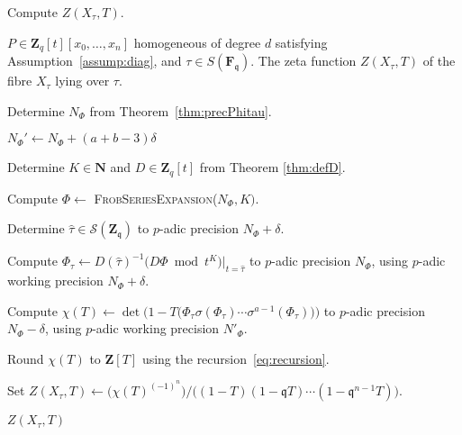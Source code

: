 \documentclass[a4paper,11pt]{article}
\numberwithin{equation}{section}
\newcommand{\NN}{\mathbf{N}} %
\newcommand{\ZZ}{\mathbf{Z}} %
\theoremstyle{definition}
\begin{document}
\begin{algorithm} 
\caption{Compute $Z(X_{\tau},T)$.}
\label{alg:complete}
\begin{algorithmic}
\vspace{1mm}
\Require $P \in \ZZ_q[t][x_0,\dotsc,x_n]$ homogeneous of degree $d$ satisfying Assumption~\ref{assump:diag}, and $\tau \in S(\mathbf{F}_{\mathfrak{q}})$.
\Ensure  The zeta function $Z(X_{\tau},T)$ of the fibre $X_{\tau}$ lying over $\tau$.
\State \begin{compactenum}[{\hspace{1em} } 1.] \vspace{-1.24em}
\item Determine $N_{\Phi}$ from Theorem~\ref{thm:precPhitau}.
\item $N_{\Phi}' \gets N_{\Phi}+(a+b-3) \delta$
\item Determine $K \in \NN$ and $D \in \ZZ_q[t]$ from Theorem \ref{thm:defD}.
\item Compute $\Phi \gets$ \textsc{FrobSeriesExpansion($N_{\Phi},K)$}.
\item Determine $\hat{\tau} \in \mathcal{S}(\ZZ_{\mathfrak{q}})$ to $p$-adic precision $N_{\Phi}+\delta$.
\item Compute $\Phi_{\tau} \gets D(\hat{\tau})^{-1} \bigl( D \Phi \bmod{t^{K}} \bigr)|_{t=\hat{\tau}}$ 
      to $p$-adic precision $N_{\Phi}$, using $p$-adic working precision $N_{\Phi}+\delta$.
\item Compute $\chi(T) \gets \det\bigl(1-T \bigl(\Phi_{\tau} \sigma(\Phi_{\tau}) \dotsm \sigma^{a-1}(\Phi_{\tau}) \bigr)  \bigr)$ to $p$-adic precision $N_{\Phi}-\delta$, 
      using $p$-adic working precision $N'_{\Phi}$.
\item Round $\chi(T)$ to $\ZZ[T]$ using the recursion~\eqref{eq:recursion}. 
\item Set $Z(X_{\tau},T) \gets \bigl( \chi(T)^{(-1)^n} \bigr)/\bigl((1 - T) (1 - \mathfrak{q}T) \dotsm (1 - \mathfrak{q}^{n-1}T)\bigr)$.
\item \Return $Z(X_{\tau},T)$
\end{compactenum}
\EndProcedure
\end{algorithmic}
\end{algorithm}
\end{document}
